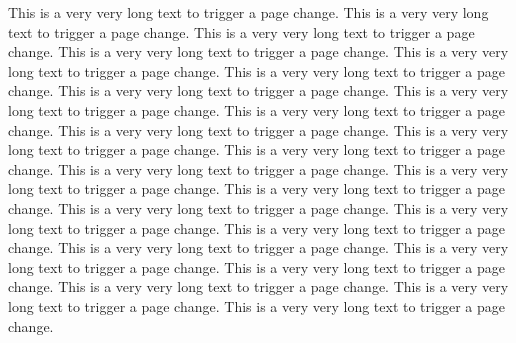 \documentclass{article}
\begin{document}
\begin{mdframed}
 This is a very very long text to trigger a page change. This is a very very long text to trigger a page change.
 This is a very very long text to trigger a page change. This is a very very long text to trigger a page change.
 This is a very very long text to trigger a page change. This is a very very long text to trigger a page change.
 This is a very very long text to trigger a page change. This is a very very long text to trigger a page change.
 This is a very very long text to trigger a page change. This is a very very long text to trigger a page change.
 This is a very very long text to trigger a page change. This is a very very long text to trigger a page change.
 This is a very very long text to trigger a page change. This is a very very long text to trigger a page change.
 This is a very very long text to trigger a page change. This is a very very long text to trigger a page change.
 This is a very very long text to trigger a page change. This is a very very long text to trigger a page change.
 This is a very very long text to trigger a page change. This is a very very long text to trigger a page change.
 This is a very very long text to trigger a page change. This is a very very long text to trigger a page change.
 This is a very very long text to trigger a page change. This is a very very long text to trigger a page change.
\end{mdframed}
\end{document}
